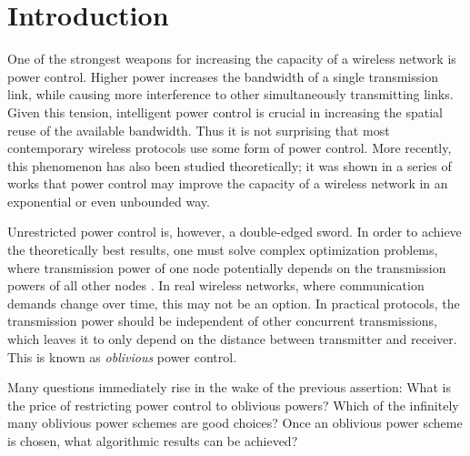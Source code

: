 \documentclass[11pt]{amsart}
\begin{document}
\maketitle


\section{Introduction}

\iffalse
Wireless nodes generally have the ability to adjust their transmission
power, even on a per-message basis. This suggests a powerful 
The ability of wireless nodes to adjust their transmission power for
each message sent suggests clear potential for performance improvement.

Power control is known to be provably powerful mechanism for increasing efficiency in wireless networks. 
Begs the question of how powerful it is.

\fi

One of the strongest weapons for increasing the capacity of a wireless
network is power control. Higher power increases the bandwidth of a
single transmission link, while causing more interference to other
simultaneously transmitting links.  Given this tension,
intelligent power control is crucial in increasing the spatial reuse
of the available bandwidth. Thus it is not surprising that most
contemporary wireless protocols use some form of power control.
More recently, this phenomenon has also been studied
theoretically; it was shown in a series of works that power
control may improve the capacity of a wireless network in an
exponential \cite{MoWa06,us:esa09full} or even unbounded
\cite{FKRV09} way.

Unrestricted power control is, however, a double-edged sword. 
In order to achieve the
theoretically best results, one must solve complex optimization
problems, where transmission power of one node potentially depends on
the transmission powers of all other nodes \cite{KesselheimSoda11}. In real wireless networks,
where communication demands change over time, this may not be an option. In
practical protocols, the transmission power should be independent of
other concurrent transmissions, which leaves it to only depend on 
the distance between transmitter and receiver. This
is known as \emph{oblivious} power control.

Many questions immediately rise in the wake of the previous assertion:
What is the price of restricting power control to oblivious powers? Which of the infinitely many oblivious power schemes are
good choices? Once an oblivious power scheme is chosen, what algorithmic results
can be achieved?
\end{document}
